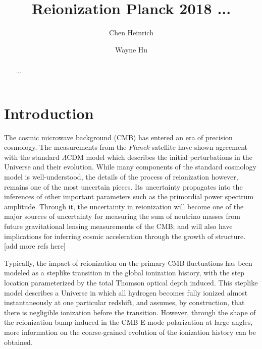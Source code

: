 \documentclass[prd,twocolumn,amsmath,amssymb,floatfix,superscriptaddress,nofootinbib]{revtex4-1}
\begin{document}
	
\title{Reionization Planck 2018 ...}

\author{Chen Heinrich}

\author{Wayne Hu}

\begin{abstract}

...

\end{abstract}
\pacs{}

\maketitle




\section{Introduction}
\label{sec:intro}

The cosmic microwave background (CMB) has entered an era of precision cosmology. The measurements from the \textit{Planck} satellite have shown agreement with the standard $\Lambda$CDM model which describes the initial perturbations in the Universe and their evolution. While many components of the standard cosmology model is well-understood, the details of the process of reionization however, remains one of the most uncertain pieces. Its uncertainty propagates into the inferences of other important parameters such as the primordial power spectrum amplitude. Through it, the uncertainty in reionization will become one of the major sources of uncertainty for measuring the sum of neutrino masses from future gravitational lensing measurements of the CMB; and will also have implications for inferring cosmic acceleration through the growth of structure. [add more refs here]

Typically, the impact of reionization on the primary CMB fluctuations has been modeled as a steplike transition in the global ionization history, with the step location parameterized by the total Thomson optical depth induced. This steplike model describes a Universe in which all hydrogen becomes fully ionized almost instantaneously at one particular redshift, and assumes, by construction, that there is negligible ionization before the transition. However, through the shape of the reionization bump induced in the CMB E-mode polarization at large angles, more information on the coarse-grained evolution of the ionization history can be obtained. 
\end{document}
